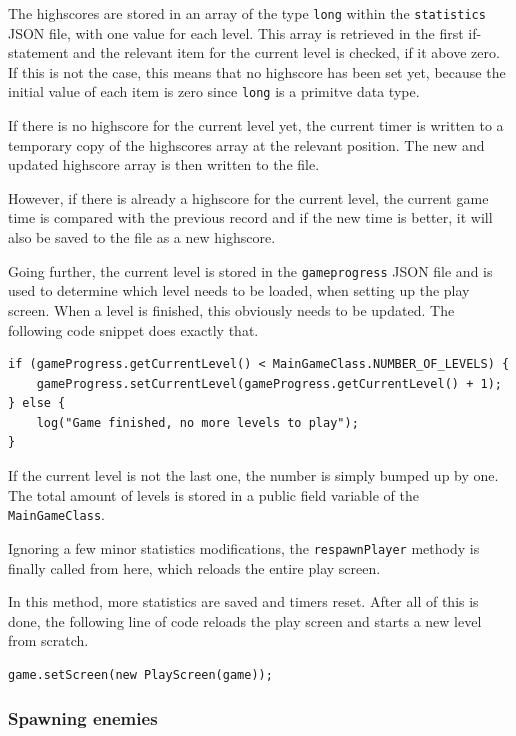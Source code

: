 \documentclass[12p]{article}
\begin{document}
The highscores are stored in an array of the type \texttt{long} within the \texttt{statistics} JSON file, with one value for each level. This array is retrieved in the first if-statement and the relevant item for the current level is checked, if it above zero. If this is not the case, this means that no highscore has been set yet, because the initial value of each item is zero since \texttt{long} is a primitve data type. 

If there is no highscore for the current level yet, the current timer is written to a temporary copy of the highscores array at the relevant position. The new and updated highscore array is then written to the file.

However, if there is already a highscore for the current level, the current game time is compared with the previous record and if the new time is better, it will also be saved to the file as a new highscore.

Going further, the current level is stored in the \texttt{gameprogress} JSON file and is used to determine which level needs to be loaded, when setting up the play screen. When a level is finished, this obviously needs to be updated. The following code snippet does exactly that.

\begin{verbatim}
if (gameProgress.getCurrentLevel() < MainGameClass.NUMBER_OF_LEVELS) {
    gameProgress.setCurrentLevel(gameProgress.getCurrentLevel() + 1);
} else {
    log("Game finished, no more levels to play");
}
\end{verbatim}

If the current level is not the last one, the number is simply bumped up by one. The total amount of levels is stored in a public field variable of the \texttt{MainGameClass}.

Ignoring a few minor statistics modifications, the \texttt{respawnPlayer} methody is finally called from here, which reloads the entire play screen.

In this method, more statistics are saved and timers reset. After all of this is done, the following line of code reloads the play screen and starts a new level from scratch.

\begin{verbatim}
game.setScreen(new PlayScreen(game));
\end{verbatim}

\subsubsection{Spawning enemies} 
\end{document}
